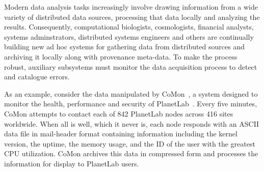 
Modern data analysis tasks increasingly involve drawing information
from a wide variety of distributed data sources, processing that data
locally and analyzing the results.  Consequently, computational
biologists, cosmologists, financial analysts, systems adminstrators,
distributed systems engineers and others are continually
building new ad hoc systems for gathering data from distributed
sources and archiving it locally along with provenance meta-data.  To
make the process robust, auxiliary subsystems must monitor the data
acquisition process to detect and catalogue errors.

As an example, consider the data
manipulated by CoMon~\cite{comon}, a system designed to monitor the
health, performance and security of PlanetLab~\cite{planetlab}.  Every
five minutes, CoMon attempts to contact each of 842 PlanetLab nodes
across 416 sites worldwide.%
% 
When all is well, which it never is, each node responds with
an ASCII data file in mail-header format containing information
including the kernel version, the uptime, the memory usage, and
the ID of the user with the greatest CPU utilization.  CoMon archives
this data in compressed form and processes the information
for display to PlanetLab users.  



